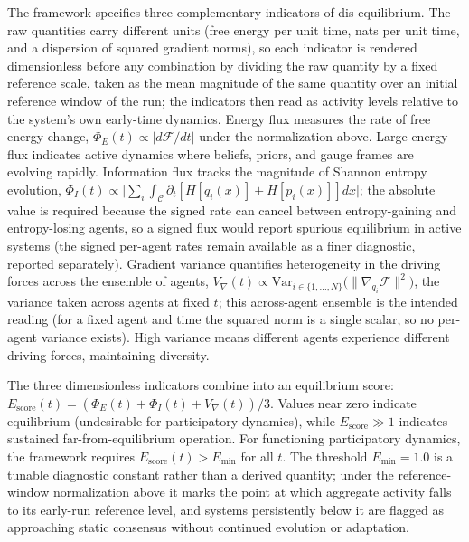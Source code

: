 \documentclass[11pt]{article}
\begin{document}
The framework specifies three complementary indicators of dis-equilibrium. The raw quantities carry different units (free energy per unit time, nats per unit time, and a dispersion of squared gradient norms), so each indicator is rendered dimensionless before any combination by dividing the raw quantity by a fixed reference scale, taken as the mean magnitude of the same quantity over an initial reference window of the run; the indicators then read as activity levels relative to the system's own early-time dynamics. Energy flux measures the rate of free energy change, $\Phi_E(t) \propto |d\mathcal{F}/dt|$ under the normalization above. Large energy flux indicates active dynamics where beliefs, priors, and gauge frames are evolving rapidly. Information flux tracks the magnitude of Shannon entropy evolution, $\Phi_I(t) \propto \big|\sum_i \int_{\mathcal{C}} \partial_t[H[q_i(x)] + H[p_i(x)]] dx\big|$; the absolute value is required because the signed rate can cancel between entropy-gaining and entropy-losing agents, so a signed flux would report spurious equilibrium in active systems (the signed per-agent rates remain available as a finer diagnostic, reported separately). Gradient variance quantifies heterogeneity in the driving forces across the ensemble of agents, $V_{\nabla}(t) \propto \mathrm{Var}_{i \in \{1,\dots,N\}}\big(\|\nabla_{q_i} \mathcal{F}\|^2\big)$, the variance taken across agents at fixed $t$; this across-agent ensemble is the intended reading (for a fixed agent and time the squared norm is a single scalar, so no per-agent variance exists). High variance means different agents experience different driving forces, maintaining diversity.

The three dimensionless indicators combine into an equilibrium score: $E_{\mathrm{score}}(t) = (\Phi_E(t) + \Phi_I(t) + V_{\nabla}(t))/3$. Values near zero indicate equilibrium (undesirable for participatory dynamics), while $E_{\mathrm{score}} \gg 1$ indicates sustained far-from-equilibrium operation. For functioning participatory dynamics, the framework requires $E_{\mathrm{score}}(t) > E_{\min}$ for all $t$. The threshold $E_{\min} = 1.0$ is a tunable diagnostic constant rather than a derived quantity; under the reference-window normalization above it marks the point at which aggregate activity falls to its early-run reference level, and systems persistently below it are flagged as approaching static consensus without continued evolution or adaptation.
\end{document}
